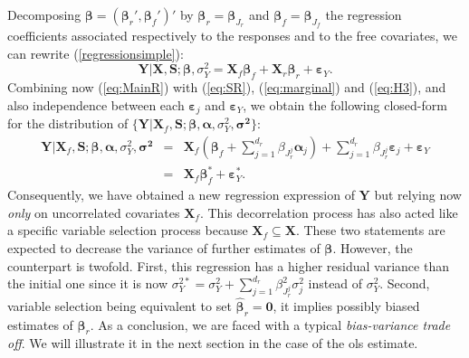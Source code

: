 \documentclass[11pt,a4paper]{article}
\begin{document}
Decomposing $\boldsymbol{\beta}=(\boldsymbol{\beta}_r',\boldsymbol{\beta}_f')'$ by $\boldsymbol{\beta}_r=\boldsymbol{\beta}_{J_r}$ and $\boldsymbol{\beta}_f=\boldsymbol{\beta}_{J_f}$ the regression coefficients associated respectively to the responses and to the free covariates, we can rewrite (\ref{regressionsimple}):
\begin{equation}
			\boldsymbol{Y}{|\boldsymbol{X},\boldsymbol{S}};\boldsymbol{\beta},\sigma_Y^2=\boldsymbol{X}_f\boldsymbol{\beta}_f+\boldsymbol{X}_r\boldsymbol{\beta}_r+\boldsymbol{\varepsilon}_Y. \label{eq:MainR}
\end{equation}
Combining now (\ref{eq:MainR}) with (\ref{eq:SR}), (\ref{eq:marginal}) and (\ref{eq:H3}), and also independence between each $\boldsymbol{\varepsilon}_j$ and $\boldsymbol{\varepsilon}_Y$, we obtain the following closed-form for the distribution of $\{\boldsymbol{Y} |\boldsymbol{X}_f,\boldsymbol{S};\boldsymbol{\beta},\boldsymbol{\alpha},\sigma_Y^2,\boldsymbol{\sigma^2}\}$:
\begin{eqnarray}
	\boldsymbol{Y}{|\boldsymbol{X}_f,\boldsymbol{S}};\boldsymbol{\beta},\boldsymbol{\alpha},\sigma_Y^2,\boldsymbol{\sigma^2}&=&\boldsymbol{X}_f (\boldsymbol{\beta}_f+ \sum_{j =1}^{d_r}\beta_{J_r^j}\boldsymbol{\alpha}_j)+  \sum_{j =1}^{d_r}\beta_{J_r^j}\boldsymbol{\varepsilon}_j+\boldsymbol{\varepsilon}_Y \label{eq:Trueexpl} \\
	&=&\boldsymbol{X}_f\boldsymbol{\beta}_f^*+\boldsymbol{\varepsilon}_Y^*.\label{eq:modexpl}
\end{eqnarray}
Consequently, we have obtained a new regression expression of $\boldsymbol{Y}$ but relying now {\it only} on uncorrelated covariates $\boldsymbol{X}_f$. This decorrelation process has also acted like a specific variable selection process because $\boldsymbol{X}_f \subseteq \boldsymbol{X}$. These two statements are expected to decrease the variance of further estimates of $\boldsymbol{\beta}$. However, the counterpart is twofold. First, this regression has a higher residual variance than the initial one since it is now $\sigma^{2*}_Y=\sigma^2_Y+\sum_{j =1}^{d_r}\beta_{J_r^j}^2\sigma^2_j$ instead of $\sigma^2_Y$. Second, variable selection being equivalent to set $\hat{\boldsymbol{\beta}}_r=\boldsymbol{0}$, it implies possibly biased estimates of $\boldsymbol{\beta}_r$. As a conclusion, we are faced with a typical {\it bias-variance trade off}. We will illustrate it in the next section in the case of the {\sc ols} estimate.

\vspace{3mm}
\end{document}
